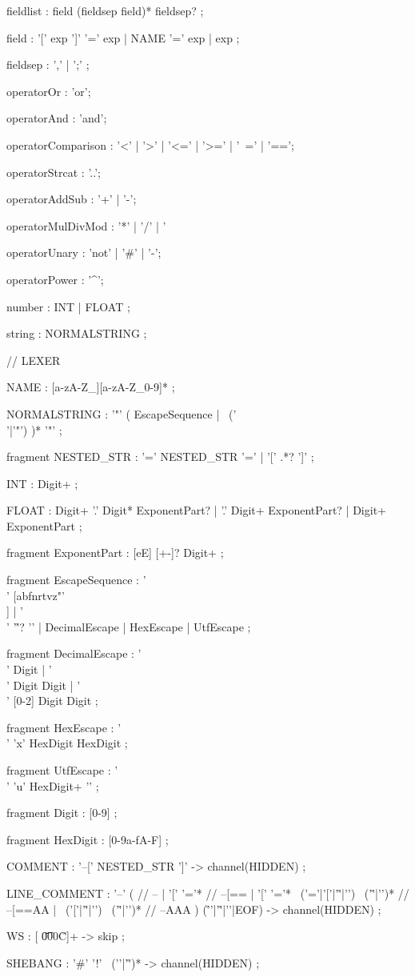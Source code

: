 fieldlist
    : field (fieldsep field)* fieldsep?
    ;

field
    : '[' exp ']' '=' exp | NAME '=' exp | exp
    ;

fieldsep
    : ',' | ';'
    ;

operatorOr
	: 'or';

operatorAnd
	: 'and';

operatorComparison
	: '<' | '>' | '<=' | '>=' | '~=' | '==';

operatorStrcat
	: '..';

operatorAddSub
	: '+' | '-';

operatorMulDivMod
	: '*' | '/' | '%

operatorUnary
    : 'not' | '#' | '-';

operatorPower
    : '^';

number
    : INT | FLOAT
    ;

string
    : NORMALSTRING
    ;

// LEXER

NAME
    : [a-zA-Z_][a-zA-Z_0-9]*
    ;

NORMALSTRING
    : '"' ( EscapeSequence | ~('\\'|'"') )* '"'
    ;

fragment
NESTED_STR
    : '=' NESTED_STR '='
    | '[' .*? ']'
    ;

INT
    : Digit+
    ;

FLOAT
    : Digit+ '.' Digit* ExponentPart?
    | '.' Digit+ ExponentPart?
    | Digit+ ExponentPart
    ;

fragment
ExponentPart
    : [eE] [+-]? Digit+
    ;

fragment
EscapeSequence
    : '\\' [abfnrtvz"'\\]
    | '\\' '\r'? '\n'
    | DecimalEscape
    | HexEscape
    | UtfEscape
    ;

fragment
DecimalEscape
    : '\\' Digit
    | '\\' Digit Digit
    | '\\' [0-2] Digit Digit
    ;

fragment
HexEscape
    : '\\' 'x' HexDigit HexDigit
    ;

fragment
UtfEscape
    : '\\' 'u{' HexDigit+ '}'
    ;

fragment
Digit
    : [0-9]
    ;

fragment
HexDigit
    : [0-9a-fA-F]
    ;

COMMENT
    : '--[' NESTED_STR ']' -> channel(HIDDEN)
    ;

LINE_COMMENT
    : '--'
    (                                               // --
    | '[' '='*                                      // --[==
    | '[' '='* ~('='|'['|'\r'|'\n') ~('\r'|'\n')*   // --[==AA
    | ~('['|'\r'|'\n') ~('\r'|'\n')*                // --AAA
    ) ('\r\n'|'\r'|'\n'|EOF)
    -> channel(HIDDEN)
    ;

WS
    : [ \t\u000C\r\n]+ -> skip
    ;

SHEBANG
    : '#' '!' ~('\n'|'\r')* -> channel(HIDDEN)
    ;

